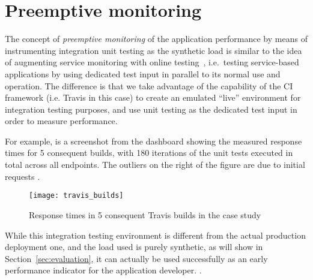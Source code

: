 
  \newpage
  \section{Preemptive monitoring}

  
  
  The concept of {\em preemptive monitoring} of the application performance by means of instrumenting integration unit testing as the synthetic load is similar to the idea of augmenting service monitoring with online testing~\cite{metzger2010proactive}, i.e.~testing service-based applications by using dedicated test input in parallel to its normal use and operation. The difference is that we take advantage of the capability of the CI framework (i.e. Travis in this case) to create an emulated ``live'' environment for integration testing purposes, and use unit testing as the dedicated test input in order to measure performance. 
  
  For example,  is a screenshot from the dashboard showing the measured response times for 5 consequent builds, with 180 iterations of the unit tests executed in total across all endpoints. The outliers on the right of the figure are due to initial requests .  


    \begin{figure}[h!]
        \centering
        \texttt{[image: travis\_builds]}
        \caption{Response times in 5 consequent Travis builds in the \zee case study}
        \label{fig:builds}
      \end{figure}

  
  While this integration testing environment is different from the actual production deployment one, and the load used is purely synthetic, as will show in Section~\ref{sec:evaluation}, it can actually be used successfully as an early performance indicator for the application developer. .  


